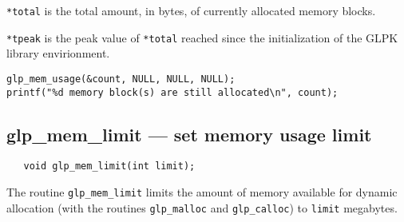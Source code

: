 \verb|*total| is the total amount, in bytes, of currently allocated
memory blocks.

\verb|*tpeak| is the peak value of \verb|*total| reached since the
initialization of the GLPK library envirionment.


\begin{footnotesize}
\begin{verbatim}
glp_mem_usage(&count, NULL, NULL, NULL);
printf("%d memory block(s) are still allocated\n", count);
\end{verbatim}
\end{footnotesize}

\subsection{glp\_mem\_limit --- set memory usage limit}

\synopsis

\begin{verbatim}
   void glp_mem_limit(int limit);
\end{verbatim}

\description

The routine \verb|glp_mem_limit| limits the amount of memory available
for dynamic allocation (with the routines \verb|glp_malloc| and
\verb|glp_calloc|) to \verb|limit| megabytes.

